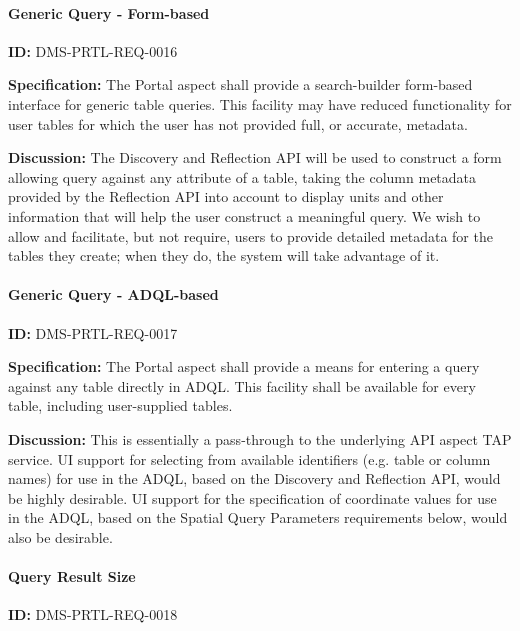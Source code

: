 \documentclass[SE,toc]{lsstdoc}
\begin{document}
\paragraph{Generic Query - Form-based}\hfill  %

\label{DMS-PRTL-REQ-0016}
\textbf{ID:} DMS-PRTL-REQ-0016

\textbf{Specification:}
The Portal aspect shall provide a search-builder form-based interface for generic table queries.  This facility may have reduced functionality for user tables for which the user has not provided full, or accurate, metadata.

\textbf{Discussion:}
The Discovery and Reflection API will be used to construct a form allowing query against any attribute of a table, taking the column metadata provided by the Reflection API into account to display units and other information that will help the user construct a meaningful query.
We wish to allow and facilitate, but not require, users to provide detailed metadata for the tables they create; when they do, the system will take advantage of it.

\paragraph{Generic Query - ADQL-based}\hfill  %

\label{DMS-PRTL-REQ-0017}
\textbf{ID:} DMS-PRTL-REQ-0017

\textbf{Specification:}
The Portal aspect shall provide a means for entering a query against any table directly in ADQL.  This facility shall be available for every table, including user-supplied tables.

\textbf{Discussion:}
This is essentially a pass-through to the underlying API aspect TAP service.
UI support for selecting from available identifiers (e.g. table or column names) for use in the ADQL, based on the Discovery and Reflection API, would be highly desirable.
UI support for the specification of coordinate values for use in the ADQL, based on the Spatial Query Parameters requirements below, would also be desirable.

\paragraph{Query Result Size}\hfill  %

\label{DMS-PRTL-REQ-0018}
\textbf{ID:} DMS-PRTL-REQ-0018
\end{document}
